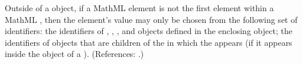 Outside of a \FunctionDefinition object, if a MathML  element is not the first element within a MathML , then the  element's value may only be chosen from the following set of identifiers: the identifiers of \Species, \Compartment, \Parameter, \SpeciesReference and \Reaction objects defined in the enclosing \Model object; the identifiers of \LocalParameter objects that are children of the \Reaction in which the \FunctionDefinition appears (if it appears inside the \Math object of a \KineticLaw).  (References: .)
